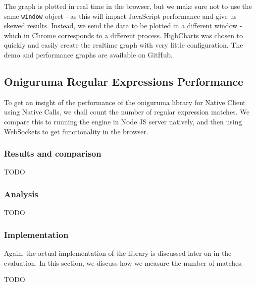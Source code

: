 The graph is plotted in real time in the browser, but we make sure not to use the same \lstinline{window} object - as this will impact JavaScript performance and give us skewed results. Instead, we send the data to be plotted in a different window - which in Chrome corresponds to a different process. HighCharts was chosen to quickly and easily create the realtime graph with very little configuration. The demo and performance graphs are available on GitHub.



\subsection{Oniguruma Regular Expressions Performance} %
\label{sub:oniguruma_regular_expressions_performance}
To get an insight of the performance of the oniguruma library for Native Client using Native Calls, we shall count the number of regular expression matches. We compare this to running the engine in Node JS server natively, and then using WebSockets to get functionality in the browser.

\subsubsection{Results and comparison} %
\label{ssub:onig_results_and_comparison}
TODO

\subsubsection{Analysis} %
\label{ssub:onig_analysis}
TODO

\subsubsection{Implementation} %
\label{ssub:onig_implementation}
Again, the actual implementation of the library is discussed later on in the evaluation. In this section, we discuss how we measure the number of matches.

TODO.



